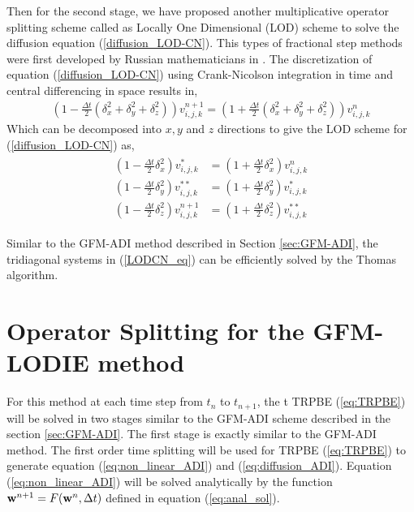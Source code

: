 Then for the second stage, we have proposed another multiplicative operator splitting scheme called as Locally One Dimensional (LOD) scheme to solve the diffusion equation (\ref{diffusion_LOD-CN}). This types of fractional step methods were first developed by Russian mathematicians in \cite{Yakonov_1963,Yanenko_1963,Yanenko_1967}. The discretization of equation (\ref{diffusion_LOD-CN}) using Crank-Nicolson integration in time and central differencing in space results in, 
\begin{eqnarray}
	\left(1-\frac{\Delta t}{2}(\delta^2_x+\delta^2_y+\delta^2_z)\right)v_{i,j,k}^{n+1}=\left(1+\frac{\Delta t}{2}(\delta^2_x+\delta^2_y+\delta^2_z)\right)v_{i,j,k}^n
\end{eqnarray}
Which can be decomposed into $x,y$ and $z$ directions to give the LOD scheme for (\ref{diffusion_LOD-CN}) as,
\begin{eqnarray}
	\begin{aligned}
	\left(1-\frac{\Delta t}{2}\delta_x^2\right)v^*_{i,j,k}&=\left(1+\frac{\Delta t}{2}\delta_x^2\right)v^n_{i,j,k}\\
	\left(1-\frac{\Delta t}{2}\delta_y^2\right)v^{**}_{i,j,k}&=\left(1+\frac{\Delta t}{2}\delta_y^2\right)v^*_{i,j,k}\\
	\left(1-\frac{\Delta t}{2}\delta_z^2\right)v^{n+1}_{i,j,k}&=\left(1+\frac{\Delta t}{2}\delta_z^2\right)v^{**}_{i,j,k}\label{LODCN_eq}
	\end{aligned}
\end{eqnarray}

Similar to the GFM-ADI method described in Section \ref{sec:GFM-ADI}, the tridiagonal systems in (\ref{LODCN_eq}) can be efficiently solved by the Thomas algorithm. 


\section{Operator Splitting for the GFM-LODIE method}

For this method at each time step from $t_n$ to $t_{n+1}$, the t TRPBE (\ref{eq:TRPBE}) will be solved in two stages similar to the GFM-ADI scheme described in the section \ref{sec:GFM-ADI}. 
The first stage is exactly similar to the GFM-ADI method. The first order time splitting will be used for 
 TRPBE (\ref{eq:TRPBE}) to generate   equation (\ref{eq:non_linear_ADI}) and (\ref{eq:diffusion_ADI}). Equation (\ref{eq:non_linear_ADI}) will be solved analytically by the function ${\bf w}^{n+1}=F({\bf w}^n,\Delta t)$ defined in equation (\ref{eq:anal_sol}).
 
